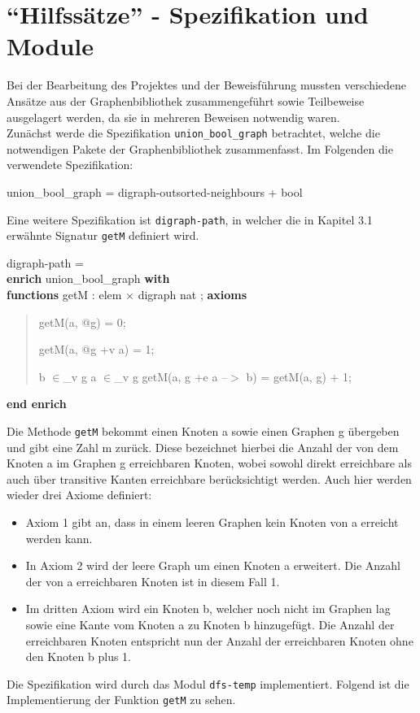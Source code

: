 ﻿\section{"`Hilfssätze"' - Spezifikation und Module}
\label{sec:digraph-path}

Bei der Bearbeitung des Projektes und der Beweisführung mussten verschiedene Ansätze aus der Graphenbibliothek zusammengeführt sowie Teilbeweise ausgelagert werden, da sie in mehreren Beweisen notwendig waren.\\
Zunächst werde die Spezifikation \texttt{union\_bool\_graph} betrachtet, welche die notwendigen Pakete der Graphenbibliothek zusammenfasst. Im Folgenden die verwendete Spezifikation:

union\_bool\_graph = digraph-outsorted-neighbours + bool

Eine weitere Spezifikation ist \texttt{digraph-path}, in welcher die in Kapitel 3.1 erwähnte Signatur \texttt{getM} definiert wird.

digraph-path = \\
{\bf enr}\={\bf ich} union\_bool\_graph {\bf with}\+\\
{\bf functions} getM  : elem $\times$ digraph \Imp  nat ;
{\bf axioms}

\begin{quote}
getM(a, @g) = 0;

getM(a, @g +v a) = 1;

\Not b $\in$\_v g \And a $\in$\_v g \Imp getM(a, g +e a --$>$ b) = getM(a, g) + 1;

\end{quote}
{\bf end enrich}

Die Methode \texttt{getM} bekommt einen Knoten a sowie einen Graphen g übergeben und gibt eine Zahl m zurück. Diese bezeichnet hierbei die Anzahl der von dem Knoten a im Graphen g erreichbaren Knoten, wobei sowohl direkt erreichbare als auch über transitive Kanten erreichbare berücksichtigt werden. Auch hier werden wieder drei Axiome definiert:

\begin{itemize}
	\item Axiom 1 gibt an, dass in einem leeren Graphen kein Knoten von a erreicht werden kann.
	\item In Axiom 2 wird der leere Graph um einen Knoten a erweitert. Die Anzahl der von a erreichbaren Knoten ist in diesem Fall 1.
	\item Im dritten Axiom wird ein Knoten b, welcher noch nicht im Graphen lag sowie eine Kante vom Knoten a zu Knoten b hinzugefügt. Die Anzahl der erreichbaren Knoten entspricht nun der Anzahl der erreichbaren Knoten ohne den Knoten b plus 1. 
\end{itemize}
Die Spezifikation wird durch das Modul \texttt{dfs-temp} implementiert. Folgend ist die Implementierung der Funktion \texttt{getM} zu sehen.

